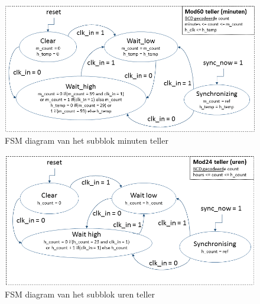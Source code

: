 \begin{figure}[h!]
\begin{center}
\includegraphics[keepaspectratio=true,scale=0.6]{Figuren/DCF77/FSM_minuten}
\captionsetup{justification=centering}\caption{FSM diagram van het subblok minuten teller}
\label{fig: minuten_teller}
\end{center}
\end{figure}

\begin{figure}[h!]
\begin{center}
\includegraphics[keepaspectratio=true,scale=0.6]{Figuren/DCF77/FSM_uren}
\captionsetup{justification=centering}\caption{FSM diagram van het subblok uren teller}
\label{fig: uren_teller}
\end{center}
\end{figure}